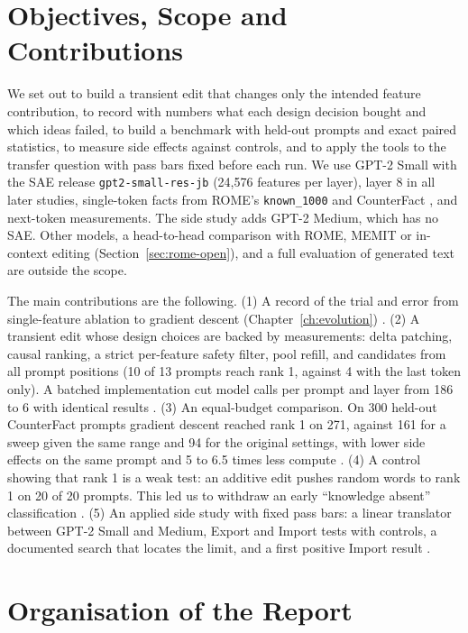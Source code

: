 \section{Objectives, Scope and Contributions}

We set out to build a transient edit that changes only the intended feature contribution, to record with numbers what each design decision bought and which ideas failed, to build a benchmark with held-out prompts and exact paired statistics, to measure side effects against controls, and to apply the tools to the transfer question with pass bars fixed before each run. We use GPT-2 Small with the SAE release \texttt{gpt2-small-res-jb} (24,576 features per layer), layer 8 in all later studies, single-token facts from ROME's \texttt{known\_1000} and CounterFact \cite{r2}, and next-token measurements. The side study adds GPT-2 Medium, which has no SAE. Other models, a head-to-head comparison with ROME, MEMIT or in-context editing (Section~\ref{sec:rome-open}), and a full evaluation of generated text are outside the scope.

The main contributions are the following. (1) A record of the trial and error from single-feature ablation to gradient descent (Chapter~\ref{ch:evolution}) \cite{p1,p13}. (2) A transient edit whose design choices are backed by measurements: delta patching, causal ranking, a strict per-feature safety filter, pool refill, and candidates from all prompt positions (10 of 13 prompts reach rank 1, against 4 with the last token only). A batched implementation cut model calls per prompt and layer from 186 to 6 with identical results \cite{p5,p7}. (3) An equal-budget comparison. On 300 held-out CounterFact prompts gradient descent reached rank 1 on 271, against 161 for a sweep given the same range and 94 for the original settings, with lower side effects on the same prompt and 5 to 6.5 times less compute \cite{p13}. (4) A control showing that rank 1 is a weak test: an additive edit pushes random words to rank 1 on 20 of 20 prompts. This led us to withdraw an early ``knowledge absent'' classification \cite{p14}. (5) An applied side study with fixed pass bars: a linear translator between GPT-2 Small and Medium, Export and Import tests with controls, a documented search that locates the limit, and a first positive Import result \cite{p16,p17}.

\section{Organisation of the Report}


